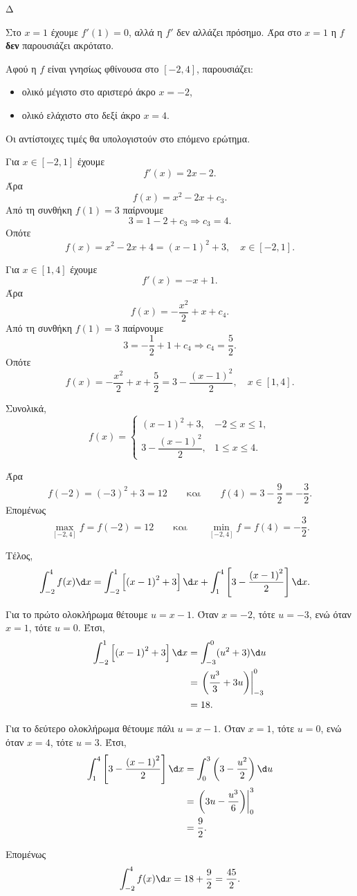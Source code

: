 \begin{thema}{Δ}
\begin{erwthma}
Στο $x=1$ έχουμε $f'(1)=0$, αλλά η $f'$ δεν αλλάζει πρόσημο. Άρα στο
$x=1$ η $f$ \textbf{δεν} παρουσιάζει ακρότατο.

Αφού η $f$ είναι γνησίως φθίνουσα στο $[-2,4]$, παρουσιάζει:
\begin{itemize}
\item ολικό μέγιστο στο αριστερό άκρο $x=-2$,
\item ολικό ελάχιστο στο δεξί άκρο $x=4$.
\end{itemize}
Οι αντίστοιχες τιμές θα υπολογιστούν στο επόμενο ερώτημα.

\item Για $x\in[-2,1]$ έχουμε
\[
f'(x)=2x-2.
\]
Άρα
\[
f(x)=x^2-2x+c_3.
\]
Από τη συνθήκη $f(1)=3$ παίρνουμε
\[
3=1-2+c_3\Rightarrow c_3=4.
\]
Οπότε
\[
f(x)=x^2-2x+4={(x-1)}^2+3,\quad x\in[-2,1].
\]

Για $x\in[1,4]$ έχουμε
\[
f'(x)=-x+1.
\]
Άρα
\[
f(x)=-\frac{x^2}{2}+x+c_4.
\]
Από τη συνθήκη $f(1)=3$ παίρνουμε
\[
3=-\frac12+1+c_4\Rightarrow c_4=\frac52.
\]
Οπότε
\[
f(x)=-\frac{x^2}{2}+x+\frac52
=3-\frac{{(x-1)}^2}{2},\quad x\in[1,4].
\]

Συνολικά,
\[
{
f(x)=
\begin{cases}
{(x-1)}^2+3, & -2\leq x\leq 1,\\[1mm]
3-\dfrac{{(x-1)}^2}{2}, & 1\leq x\leq 4.
\end{cases}}
\]

Άρα
\[
f(-2)={(-3)}^2+3=12
\qquad\text{και}\qquad
f(4)=3-\frac{9}{2}=-\frac32.
\]
Επομένως
\[
{\max_{[-2,4]}f=f(-2)=12}
\qquad\text{και}\qquad
{\min_{[-2,4]}f=f(4)=-\frac32}.
\]

Τέλος,
\begin{align*}
\int_{-2}^{4} f(x)\d x
&=\int_{-2}^{1}\left[{(x-1)}^2+3\right]\d x
+\int_{1}^{4}\left[3-\frac{{(x-1)}^2}{2}\right]\d x.
\end{align*}

Για το πρώτο ολοκλήρωμα θέτουμε $u=x-1$. Όταν $x=-2$, τότε $u=-3$,
ενώ όταν $x=1$, τότε $u=0$. Έτσι,
\begin{align*}
\int_{-2}^{1}\left[{(x-1)}^2+3\right]\d x
&=\int_{-3}^{0}(u^2+3)\d u\\
&=\left.\left(\frac{u^3}{3}+3u\right)\right|_{-3}^{0}\\
&=18.
\end{align*}

Για το δεύτερο ολοκλήρωμα θέτουμε πάλι $u=x-1$. Όταν $x=1$, τότε
$u=0$, ενώ όταν $x=4$, τότε $u=3$. Έτσι,
\begin{align*}
\int_{1}^{4}\left[3-\frac{{(x-1)}^2}{2}\right]\d x
&=\int_{0}^{3}\left(3-\frac{u^2}{2}\right)\d u\\
&=\left.\left(3u-\frac{u^3}{6}\right)\right|_{0}^{3}\\
&=\frac{9}{2}.
\end{align*}

Επομένως
\[
{\int_{-2}^{4} f(x)\d x=18+\frac92=\frac{45}{2}}.
\]
\end{erwthma}
\end{thema}

